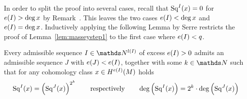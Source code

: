 In order to split the proof into several cases, recall that
$\mathrm{Sq}^{I}(x) = 0$ for $e(I)>\deg x$ by
Remark~. This leaves the two
cases $e(I)<\deg x$ and $e(I)=\deg x$.
Inductively applying the following Lemma by Serre restricts the
proof of Lemma~\ref{lem:masseystep1} to the first case where $e(I)<q$.
\begin{Lem}[Serre]
  \label{lem:serre}
  Every admissible sequence $I\in\Nat^{\l(I)}$ of excess $e(I)>0$
  admits an admissible sequence $J$ with $e(J)<e(I)$,
  together with some $k\in\Nat$
  such that for any cohomology class $x\in H^{e(I)}(M)$ holds
  \begin{gather*}
    \mathrm{Sq}^{I}(x) = \left(\mathrm{Sq}^{J}(x)\right) ^{2^k}
    \qquad\text{respectively}\qquad
    \deg\left(\mathrm{Sq}^{I}(x)\right) = 2^k\cdot \deg\left(\mathrm{Sq}^{J}(x)\right)
  \end{gather*}
\end{Lem}

